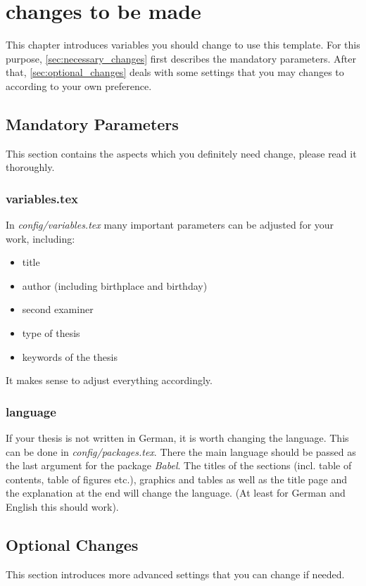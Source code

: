\chapter{changes to be made}
\label{chap:changes}

This chapter introduces variables you should change to use this template.
For this purpose, \autoref{sec:necessary_changes} first describes the mandatory parameters.  After that, \autoref{sec:optional_changes} deals with some settings that you may changes to according to your own preference.

\section{Mandatory Parameters}
\label{sec:necessary_changes}

This section contains the aspects which you definitely need change, please read it thoroughly.

\subsection{variables.tex}
In \textit{config/variables.tex} many important parameters can be adjusted for your work, including:
\begin{itemize}
	\item title
	\item author (including birthplace and birthday)
	\item second examiner
	\item type of thesis
	\item keywords of the thesis
\end{itemize}
It makes sense to adjust everything accordingly.

\subsection{language}
If your thesis is not written in German, it is worth changing the language. This can be done in \textit{config/packages.tex}. There the main language should be passed as the last argument for the package \textit{Babel}.
The titles of the sections (incl. table of contents, table of figures etc.), graphics and tables as well as the title page and the explanation at the end will change the language. (At least for German and English this should work).


\section{Optional Changes}
\label{sec:optional_changes}
This section introduces more advanced settings that you can change if needed.

